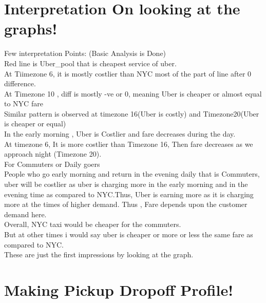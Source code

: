 \documentclass{article}
\begin{document}
\pagebreak
\section{Interpretation On looking at the graphs!}

Few interpretation Points: (Basic Analysis is Done)
\\Red line is Uber\_pool that is  cheapest service of uber.
\\At Tiimezone 6, it is mostly costlier than NYC most of the part of line after 0 difference.
\\At Timezone 10 , diff is mostly -ve or 0, meaning Uber is cheaper or almost equal to NYC fare
\\Similar pattern is observed at timezone 16(Uber is costly) and Timezone20(Uber is cheaper or equal)
\\In the early morning , Uber is Costlier and fare decreases during the day. 
\\At timezone 6, It is more costlier than Timezone 16, Then fare decreases as we approach night (Timezone 20).
\\ For Commuters or Daily goers 
\\ People who go early morning and return in the evening daily that is  Commuters, uber will be costlier as uber is charging more in the early morning and in the evening time as compared to NYC.Thus, Uber is earning more as it is charging more at the times of higher demand. Thus , Fare depends upon the customer demand here.
\\Overall, NYC taxi would be cheaper for the commuters.
\\But at other times i would say uber is cheaper or more or less the same fare as compared to NYC.
\\ These are just the first impressions by looking at the graph.


\section{Making Pickup Dropoff Profile!}
\end{document}
